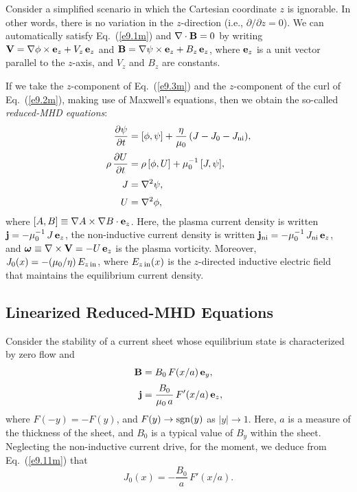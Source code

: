 \documentclass[12pt,prb,aps]{revtex4-1}
\newcommand{\bomega}{\mbox{\boldmath$\omega$}}
\begin{document}
Consider a simplified scenario in which the Cartesian coordinate $z$ is ignorable. In other words, there is
no variation in the $z$-direction (i.e., $\partial/\partial z=0$). We can automatically satisfy Eq.~(\ref{e9.1m})
and $\nabla\cdot{\bf B} = 0$ by writing
${\bf V} =\nabla\phi\times {\bf e}_z + V_z\,{\bf e}_z$ and 
${\bf B} = \nabla\psi\times{\bf e}_z + B_z\,{\bf e}_z$,
where ${\bf e}_z$ is a unit vector parallel to the $z$-axis, and $V_z$ and $B_z$  are constants.  

If we take the $z$-component of Eq.~(\ref{e9.3m}) and the $z$-component of the curl of Eq.~(\ref{e9.2m}), making use of Maxwell's equations,
then we obtain the  so-called {\em reduced-MHD equations}:\,\cite{strauss}
\begin{align}
\frac{\partial\psi}{\partial t} &= [\phi,\psi]+\frac{\eta}{\mu_0}\,(J-J_0-J_{\rm ni}),\label{e9.11m}\\[0.5ex]
\rho\,\frac{\partial U}{\partial t} &= \rho\,[\phi,U] + \mu_0^{-1}\,[J,\psi],\\[0.5ex]
J&=\nabla^2\psi,\\[0.5ex]
U&=\nabla^2\phi,\label{e9.14m}
\end{align}
where $[A,B]\equiv \nabla A\times \nabla B\cdot{\bf e}_z$. Here, the plasma current density
is written ${\bf j} = -\mu_0^{-1}\,J\,{\bf e}_z$, the  non-inductive current density is written ${\bf j}_{\rm ni} = -\mu_0^{-1}\,J_{\rm ni}\, {\bf e}_z$, 
 and $\bomega\equiv \nabla\times{\bf V}=-U\,{\bf e}_z$ is the plasma vorticity. 
Moreover, $J_0(x)=-(\mu_0/\eta)\,E_{z\,{\rm in}}$, where $E_{z\,{\rm in}}(x)$ is  the $z$-directed inductive electric field that maintains the equilibrium current density.

\subsection{Linearized Reduced-MHD Equations}
Consider the stability of a current sheet whose equilibrium state is characterized by zero flow and 
\begin{align}
{\bf B}&= B_0\,F(x/a)\,{\bf e}_y,\\[0.5ex]
{\bf j}&= \frac{B_0}{\mu_0\,a}\,F'(x/a)\,{\bf e}_z,
\end{align}
where $F(-y)= - F(y)$, and $F(y)\rightarrow {\rm sgn}(y)$ as $|y|\rightarrow 1$. Here, $a$ is a measure of the thickness of the sheet, and $B_0$ is a typical value of $B_y$ within the sheet.   Neglecting the non-inductive current
drive, for the moment, 
 we  deduce from Eq.~(\ref{e9.11m}) that
\begin{equation}
J_0(x) = - \frac{B_0}{a}\,F'(x/a).
\end{equation}
\end{document}
